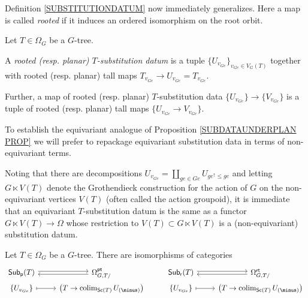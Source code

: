 \documentclass[a4paper,10pt]{article}%
\begin{document}
Definition \ref{SUBSTITUTIONDATUM} now immediately generalizes. Here a map is called \textit{rooted} if it induces an ordered isomorphism on the root orbit.


\begin{definition}\label{SUBSTITUTIONDATUMG DEF}
  Let $T \in \Omega_G$ be a $G$-tree.
  
  A \textit{rooted (resp. planar) $T$-substitution datum} is a tuple 
  $\{U_{v_{G e}}\}_{v_{G e} \in V_G(T)}$ together with rooted (resp. planar) tall maps 
  $T_{v_{Ge}} \to U_{v_{G e}} = T_{v_{G e}}$.
  
  Further, a map of rooted (resp. planar) $T$-substitution data 
  $\{U_{v_{G e}}\} \to \{V_{v_{G e}}\}$ is a tuple of rooted (resp. planar) tall maps $\{U_{v_{G e}} \to V_{v_{G e}}\}$.
\end{definition}

\begin{remark}\label{SUBSDATUMCONV REM}
  To establish the equivariant analogue of Proposition \ref{SUBDATAUNDERPLAN PROP} we will prefer to repackage equivariant substitution data in terms of non-equivariant terms.

  Noting that there are decompositions 
  $U_{v_{G e}}= \coprod_{g e \in Ge} U_{ge^{\uparrow} \leq ge}$
  and letting $G \ltimes V(T)$ denote the Grothendieck construction for the action of $G$ on the non-equivariant vertices $V(T)$ (often called the action groupoid), it is immediate that an equivariant $T$-substitution datum is the same as a functor $G \ltimes V(T) \to \Omega$ whose restriction to $V(T) \subset G \ltimes V(T)$ is a (non-equivariant) substitution datum.
\end{remark}


\begin{proposition}\label{SUBDATAUNDERPLANG PROP}
  Let $T \in \Omega_G$ be a $G$-tree. There are isomorphisms of categories
  \begin{equation}\label{SUBDATAUNDERPLANG EQ}
    \begin{tikzcd}[row sep =0pt]
      \mathsf{Sub}_{\mathsf{p}}(T) \ar[r,shift left=2pt] &
      \Omega_{G,T/}^{\mathsf{pt}} \ar[l,shift left=2pt] &
      \mathsf{Sub}_{\mathsf{r}}(T) \ar[r,shift left=2pt] &
      \Omega_{G,T/}^{\mathsf{rt}} \ar[l,shift left=2pt]
      \\
      \{U_{v_{G e}}\} \ar[r,mapsto] & 
      \left(T \to \colim_{\mathsf{Sc}(T)} U_{(\minus)}\right) &
      \{U_{v_{G e}}\} \ar[r,mapsto] & 
      \left(T \to \colim_{\mathsf{Sc}(T)} U_{(\minus)}\right)
    \end{tikzcd}
  \end{equation}
\end{proposition}
\end{document}
